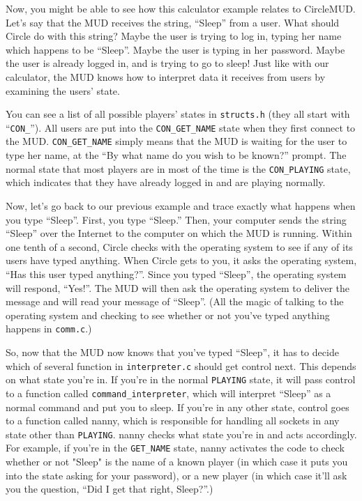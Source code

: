 \documentclass[11pt]{article}
\begin{document}
\par
Now, you might be able to see how this calculator example relates to CircleMUD.  Let's say that the MUD receives the string, ``Sleep'' from a user.  What should Circle do with this string?  Maybe the user is trying to log in, typing her name which happens to be ``Sleep''.  Maybe the user is typing in her password.  Maybe the user is already logged in, and is trying to go to sleep! Just like with our calculator, the MUD knows how to interpret data it receives from users by examining the users' state.
\par
You can see a list of all possible players' states in \texttt{structs.h} (they all start with ``\texttt{CON\_}'').  All users are put into the \texttt{CON\_GET\_NAME} state when they first connect to the MUD.  \texttt{CON\_GET\_NAME} simply means that the MUD is waiting for the user to type her name, at the ``By what name do you wish to be known?'' prompt.  The normal state that most players are in most of the time is the \texttt{CON\_PLAYING} state, which indicates that they have already logged in and are playing normally.
\par
Now, let's go back to our previous example and trace exactly what happens when you type ``Sleep''.  First, you type ``Sleep.''  Then, your computer sends the string ``Sleep'' over the Internet to the computer on which the MUD is running.  Within one tenth of a second, Circle checks with the operating system to see if any of its users have typed anything.  When Circle gets to you, it asks the operating system, ``Has this user typed anything?''.  Since you typed ``Sleep'', the operating system will respond, ``Yes!''.  The MUD will then ask the operating system to deliver the message and will read your message of ``Sleep''.  (All the magic of talking to the operating system and checking to see whether or not you've typed anything happens in \texttt{comm.c}.)
\par
So, now that the MUD now knows that you've typed ``Sleep'', it has to decide which of several function in \texttt{interpreter.c} should get control next.  This depends on what state you're in.  If you're in the normal \texttt{PLAYING} state, it will pass control to a function called \texttt{command\_interpreter}, which will interpret ``Sleep'' as a normal command and put you to sleep.  If you're in any other state, control goes to a function called nanny, which is responsible for handling all sockets in any state other than \texttt{PLAYING}.  nanny checks what state you're in and acts accordingly.  For example, if you're in the \texttt{GET\_NAME} state, nanny activates the code to check whether or not "Sleep" is the name of a known player (in which case it puts you into the state asking for your password), or a new player (in which case it'll ask you the question, ``Did I get that right, Sleep?''.)
\end{document}
